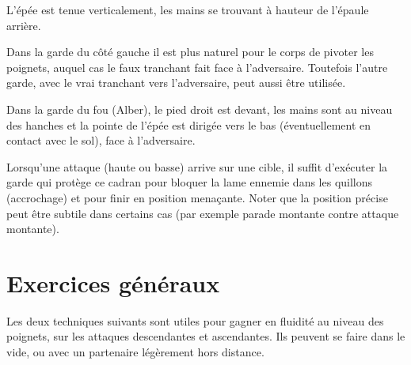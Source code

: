 \begin{garde}

L'épée est tenue verticalement, les mains se trouvant à hauteur de l'épaule arrière.
\end{garde}


Dans la garde du côté gauche il est plus naturel pour le corps de pivoter les poignets, auquel cas le faux tranchant fait face à l'adversaire.
Toutefois l'autre garde, avec le vrai tranchant vers l'adversaire, peut aussi être utilisée.


\begin{garde}

Dans la garde du fou (Alber), le pied droit est devant, les mains sont au niveau des hanches et la pointe de l'épée est dirigée vers le bas (éventuellement en contact avec le sol), face à l'adversaire.
\end{garde}


Lorsqu'une attaque (haute ou basse) arrive sur une cible, il suffit d'exécuter la garde qui protège ce cadran pour bloquer la lame ennemie dans les quillons (accrochage) et pour finir en position menaçante.
Noter que la position précise peut être subtile dans certains cas (par exemple parade montante contre attaque montante).



\section{Exercices généraux}


Les deux techniques suivants sont utiles pour gagner en fluidité au niveau des poignets, sur les attaques descendantes et ascendantes. Ils peuvent se faire dans le vide, ou avec un partenaire légèrement hors distance.

